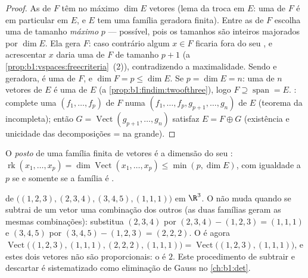 \begin{proof}
As  de $F$ têm no máximo $\dim E$ vetores (lema da
troca em $E$: uma  de $F$ é em particular  em
$E$, e $E$ tem uma família geradora finita). Entre as  de $F$ escolha uma de tamanho \emph{máximo} $p$ --- possível,
pois os tamanhos são inteiros majorados por $\dim E$. Ela gera $F$:
caso contrário algum $x \in F$ ficaria fora do seu , e
acrescentar $x$ daria uma  de $F$ de tamanho $p + 1$
(a \cref{prop:b1:vspaces:freecriteria}~(2)), contradizendo a maximalidade. Sendo  e
geradora, é uma  de $F$, e $\dim F = p \leq \dim E$. Se $p = \dim E = n$: uma 
de $n$ vetores de $E$ é uma  de $E$ (a \cref{prop:b1:findim:twoofthree}), logo $F
\supseteq \operatorname{span} = E$.
: complete uma  $(f_1, \dots, f_p)$ de $F$ numa  $(f_1, \dots, f_p, g_{p+1},
\dots, g_n)$ de $E$
(teorema da  incompleta); então $G =
\operatorname{Vect}(g_{p+1}, \dots, g_n)$ satisfaz $E = F \oplus G$
(existência e unicidade das decomposições =  na 
grande).
\end{proof}

\begin{definition}\label{def:b1:findim:rank}
O \emph{posto} de uma família finita de
vetores é a dimensão do seu :
$\operatorname{rk}(x_1, \dots, x_p) = \dim
\operatorname{Vect}(x_1, \dots, x_p) \leq \min(p, \dim E)$,
com igualdade a $p$ se e somente se a família é .
\end{definition}

\begin{example}
\label{ex:b1:findim:rankcomputation}
 de $\bigl((1,2,3), (2,3,4), (3,4,5), (1,1,1)\bigr)$ em $\R^3$. O  não muda quando se
subtrai de um vetor uma combinação dos outros (as duas famílias
geram as mesmas combinações): substitua $(2,3,4)$ por $(2,3,4) - (1,2,3) = (1,1,1)$ e
$(3,4,5)$ por $(3,4,5) - (1,2,3) = (2,2,2)$. O  é agora $\operatorname{Vect}\bigl((1,2,3), (1,1,1), (2,2,2),
(1,1,1)\bigr) = \operatorname{Vect}\bigl((1,2,3), (1,1,1)\bigr)$, e estes dois
vetores não são proporcionais: o  é $2$. Este procedimento de
subtrair e descartar é sistematizado como eliminação de Gauss no
\cref{ch:b1:det}.
\end{example}

